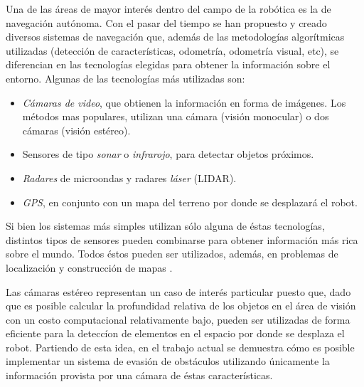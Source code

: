 \documentclass[journal]{IEEEtran}
\begin{document}
Una de las \'areas de mayor inter\'es dentro del campo de la rob\'otica es la de navegaci\'on aut\'onoma. Con el pasar del tiempo se han propuesto y creado diversos sistemas de navegaci\'on que, adem\'as de las metodolog\'ias algor\'itmicas utilizadas (detecci\'on de caracter\'isticas, odometr\'ia, odometr\'ia visual, etc), se diferencian en las tecnolog\'ias elegidas para obtener la informaci\'on sobre el entorno. Algunas de las tecnolog\'ias m\'as utilizadas son:

\begin{itemize}
	\item \emph{C\'amaras de video}, que obtienen la informaci\'on en forma de im\'agenes. Los m\'etodos mas populares, utilizan una c\'amara (visi\'on monocular) o dos c\'amaras (visi\'on est\'ereo).
	
	\item Sensores de tipo \emph{sonar} o \emph{infrarojo}, para detectar objetos pr\'oximos.
	
	\item \emph{Radares} de microondas y radares \emph{l\'aser} (LIDAR).

	\item \emph{GPS}, en conjunto con un mapa del terreno por donde se desplazar\'a el robot.
\end{itemize}

Si bien los sistemas m\'as simples utilizan s\'olo alguna de \'estas tecnolog\'ias, distintos tipos de sensores pueden combinarse para obtener informaci\'on m\'as rica sobre el mundo. Todos \'estos pueden ser utilizados, adem\'as, en problemas de localizaci\'on y construcci\'on de mapas \cite{KNG10}.

Las c\'amaras est\'ereo representan un caso de inter\'es particular puesto que, dado que es posible calcular la profundidad relativa de los objetos en el \'area de visi\'on con un costo computacional relativamente bajo, pueden ser utilizadas de forma eficiente para la detecc\'ion de elementos en el espacio por donde se desplaza el robot. Partiendo de esta idea, en el trabajo actual se demuestra cómo es posible implementar un sistema de evasi\'on de obst\'aculos utilizando \'unicamente la informaci\'on provista por una c\'amara de \'estas caracter\'isticas.
\end{document}
